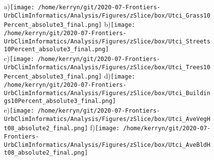 \documentclass{article}
\begin{document}
\begin{figure}           %
\centering    
{\tiny a)}\texttt{[image: /home/kerryn/git/2020-07-Frontiers-UrbClimInformatics/Analysis/Figures/zSlice/box/Utci\_Grass10Percent\_absolute3\_final.png]}
{\tiny b)}\texttt{[image: /home/kerryn/git/2020-07-Frontiers-UrbClimInformatics/Analysis/Figures/zSlice/box/Utci\_Streets10Percent\_absolute3\_final.png]}\\
{\tiny c)}\texttt{[image: /home/kerryn/git/2020-07-Frontiers-UrbClimInformatics/Analysis/Figures/zSlice/box/Utci\_Trees10Percent\_absolute3\_final.png]}
{\tiny d)}\texttt{[image: /home/kerryn/git/2020-07-Frontiers-UrbClimInformatics/Analysis/Figures/zSlice/box/Utci\_Buildings10Percent\_absolute3\_final.png]}\\
{\tiny e)}\texttt{[image: /home/kerryn/git/2020-07-Frontiers-UrbClimInformatics/Analysis/Figures/zSlice/box/Utci\_AveVegHt08\_absolute2\_final.png]}
{\tiny f)}\texttt{[image: /home/kerryn/git/2020-07-Frontiers-UrbClimInformatics/Analysis/Figures/zSlice/box/Utci\_AveBldHt08\_absolute2\_final.png]}
\end{figure} 
\clearpage

















\begin{figure}           %
\centering    
{}
\end{figure} 
\clearpage
\end{document}
